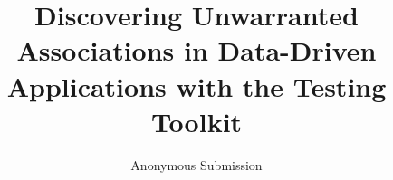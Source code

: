 \documentclass[letterpaper,single,10pt]{article}
\begin{document}
\title{Discovering Unwarranted Associations in Data-Driven Applications with the  Testing Toolkit}

  \author{ {\rm Anonymous Submission} \\ }

\maketitle


\end{document}
